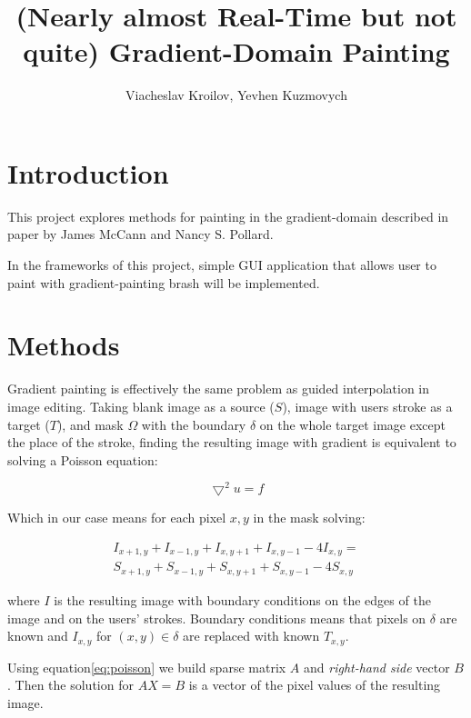 \documentclass[hidelinks, english]{report}
\title{(Nearly almost Real-Time but not quite) Gradient-Domain Painting}
\author{Viacheslav Kroilov, Yevhen Kuzmovych}
\affiliation{ČVUT - FIT}
\begin{document}
\maketitle

\section{Introduction}

This project explores methods for painting in the gradient-domain described in paper by James McCann and
Nancy S. Pollard\cite{gradient}.

In the frameworks of this project, simple GUI application that allows user to paint with gradient-painting brash will
be implemented.


\section{Methods}
Gradient painting is effectively the same problem as guided interpolation in image editing. Taking blank image as a
source ($S$), image with users stroke as a target ($T$), and mask $\Omega$ with the boundary $\delta$ on the whole
target image except the place of the stroke, finding the resulting image with gradient is equivalent to solving
a Poisson equation:

\begin{equation}
    \bigtriangledown^2 u = f
\end{equation}

Which in our case means for each pixel $x,y$ in the mask solving:

\begin{equation}
    \begin{multlined}
        I_{x+1,y} + I_{x-1,y} + I_{x,y+1} + I_{x,y-1} - 4I_{x,y} = \\
        S_{x+1,y} + S_{x-1,y} + S_{x,y+1} + S_{x,y-1} - 4S_{x,y}
    \end{multlined}
    \label{eq:poisson}
\end{equation}

where $I$ is the resulting image with boundary conditions on the edges of the image and on the users' strokes. Boundary
conditions means that pixels on $\delta$ are known and $I_{x,y}$ for $ (x,y) \in \delta$ are replaced with
known $T_{x,y}$.

Using equation\eqref{eq:poisson} we build sparse matrix $A$ and \textit{right-hand side} vector $B$. Then the solution
for $AX=B$ is a vector of the pixel values of the resulting image.
\end{document}
